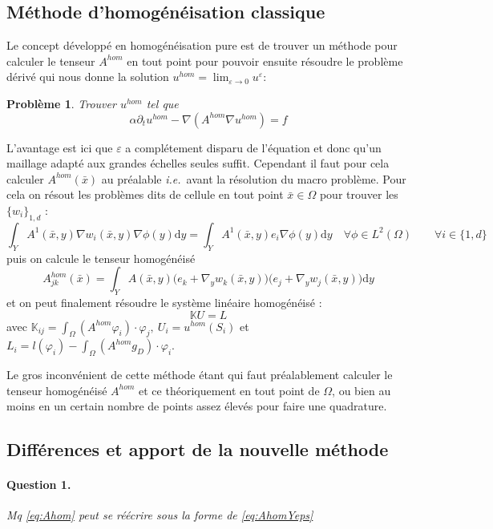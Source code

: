 \documentclass[11pt]{article}
\newtheorem{pb}{Problème}
\newcommand{\K}{\mathbb{K}}
\newcommand{\Ah}{A^{hom}}
\newcommand{\uh}{u^{hom}}
\newcommand{\bx}{\bar{x}}
\newcommand{\ue}{u^\varepsilon}
\newcommand{\ie}{\emph{i.e.{}}~}
\newcommand{\question}[2]{\paragraph{Question #1.}\textit{#2} \\}
\newcommand{\td}{\text{d}}
\begin{document}
\subsection{Méthode d'homogénéisation classique}
  
Le concept développé en homogénéisation pure est de trouver un méthode pour calculer le tenseur $\Ah$ en tout point pour pouvoir ensuite résoudre le
problème dérivé qui nous donne la solution $\uh=\lim_{\varepsilon\to 0}\ue$:
\begin{pb}
  Trouver $\uh$ tel que
  \begin{equation*}
    \alpha \partial_t \uh -\nabla(\Ah \nabla \uh) = f
  \end{equation*}
\end{pb}


L'avantage est ici que $\varepsilon$ a complétement disparu de l'équation et donc qu'un
maillage adapté aux grandes échelles seules suffit. Cependant il faut pour cela calculer $\Ah(\bx)$ au préalable \ie avant la résolution du macro
problème. Pour cela on résout les problèmes dits de cellule en tout point $\bx \in \Omega$ pour trouver les $\{w_i\}_{1, d}$ : 
\begin{equation}
  \int_Y A^1(\bx, y) \nabla w_i(\bx, y) \nabla \phi(y) \td y  = \int_Y A^1(\bx, y) e_i \nabla \phi(y) \td y
  \quad  \forall\phi\in L^2(\Omega) \qquad \forall i \in \{1, d\} 
\end{equation}
puis on calcule le tenseur homogénéisé
\begin{equation}
  \label{eq:Ahom}
  \Ah_{jk}(\bx) = \int_Y A(\bx, y)\big(e_k+\nabla_y w_k(\bx, y)\big)\big(e_j+\nabla_y w_j(\bx, y)\big) \td y 
\end{equation}
et on peut finalement résoudre le système linéaire homogénéisé :
\[
  \K U = L
\]
avec $\K_{ij} = \int_\Omega (\Ah \varphi_i)\cdot \varphi_j, ~ U_i = \uh(S_i)$ et $L_i = l(\varphi_i) - \int_\Omega (\Ah g_D)\cdot \varphi_i$.

Le gros inconvénient de cette méthode étant qui faut préalablement calculer le tenseur homogénéisé $\Ah$ et ce théoriquement en tout point de $\Omega$, ou
bien au moins en un certain nombre de points assez élevés pour faire une quadrature.

\subsection{Différences et apport de la nouvelle méthode}

\question{1}{Mq \autoref{eq:Ahom} peut se réécrire sous la forme de \autoref{eq:AhomYeps}}
\end{document}
